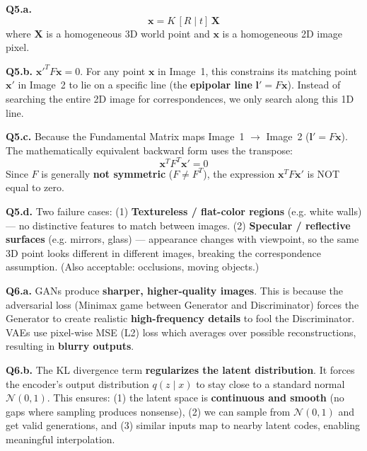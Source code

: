 \documentclass[11pt]{article}
\begin{document}
\vspace{1em}

\textbf{Q5.a.}
$$\mathbf{x} = K\,[R \mid t]\,\mathbf{X}$$
where $\mathbf{X}$ is a homogeneous 3D world point and $\mathbf{x}$ is a homogeneous 2D image pixel.

\vspace{0.75em}
\textbf{Q5.b.} $\mathbf{x}'^T F \mathbf{x} = 0$. For any point $\mathbf{x}$ in Image~1, this constrains its matching point $\mathbf{x}'$ in Image~2 to lie on a specific line (the \textbf{epipolar line} $\mathbf{l}' = F\mathbf{x}$). Instead of searching the entire 2D image for correspondences, we only search along this 1D line.

\vspace{0.75em}
\textbf{Q5.c.} Because the Fundamental Matrix maps Image~1 $\to$ Image~2 ($\mathbf{l}' = F\mathbf{x}$). The mathematically equivalent backward form uses the transpose:
$$\mathbf{x}^T F^T \mathbf{x}' = 0$$
Since $F$ is generally \textbf{not symmetric} ($F \neq F^T$), the expression $\mathbf{x}^T F \mathbf{x}'$ is NOT equal to zero.

\vspace{0.75em}
\textbf{Q5.d.} Two failure cases:
(1) \textbf{Textureless / flat-color regions} (e.g. white walls) — no distinctive features to match between images.
(2) \textbf{Specular / reflective surfaces} (e.g. mirrors, glass) — appearance changes with viewpoint, so the same 3D point looks different in different images, breaking the correspondence assumption.
(Also acceptable: occlusions, moving objects.)

\vspace{1em}

\textbf{Q6.a.} GANs produce \textbf{sharper, higher-quality images}. This is because the adversarial loss (Minimax game between Generator and Discriminator) forces the Generator to create realistic \textbf{high-frequency details} to fool the Discriminator. VAEs use pixel-wise MSE (L2) loss which averages over possible reconstructions, resulting in \textbf{blurry outputs}.

\vspace{0.75em}
\textbf{Q6.b.} The KL divergence term \textbf{regularizes the latent distribution}. It forces the encoder's output distribution $q(z\mid x)$ to stay close to a standard normal $\mathcal{N}(0, 1)$. This ensures: (1) the latent space is \textbf{continuous and smooth} (no gaps where sampling produces nonsense), (2) we can sample from $\mathcal{N}(0,1)$ and get valid generations, and (3) similar inputs map to nearby latent codes, enabling meaningful interpolation.
\end{document}
